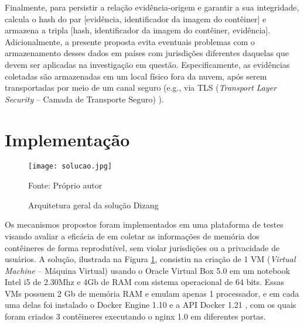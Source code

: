 Finalmente, para persistir a relação evidência-origem e garantir a sua integridade, \fancyname calcula o hash do par [evidência, identificador da imagem do contêiner] e armazena a tripla [hash, identificador da imagem do contêiner, evidência].
%
Adicionalmente, a presente proposta evita eventuais problemas com o armazenamento desses dados em países com jurisdições diferentes daquelas que devem ser aplicadas na investigação em questão.
%
Especificamente, as evidências coletadas são armazenadas em um local físico fora da nuvem, após serem transportadas por meio de um canal seguro (e.g., via TLS (\textit{Transport Layer Security} -- Camada de Transporte Seguro) \cite{DierksT2008}).
%

\section{Implementação}
\label{sec:proposta-impl}


\begin{figure}[htb!]
\footnotesize
\caption{Arquitetura geral da solução Dizang}
\texttt{[image: solucao.jpg]}
\centering
\label{fig:Solucao}
\begin{center}
Fonte: Próprio autor 
\end{center}
\end{figure}


Os mecanismos propostos foram implementados em uma plataforma de testes visando avaliar a eficácia de \fancyname em coletar as informações de memória dos contêineres de forma reprodutível, sem violar jurisdições ou a privacidade de usuários.
%
A solução, ilustrada na Figura \ref{fig:Solucao}, consistiu na criação de 1 VM  (\textit{Virtual Machine} -- Máquina Virtual) usando o Oracle Virtual Box 5.0 \cite{VirtualBox} em um notebook Intel i5 de 2.30Mhz e 4Gb de RAM com sistema operacional de 64 bits.
%
Essas VMs possuem 2 Gb de memória RAM e emulam apenas 1 processador, e em cada uma delas foi instalado o Docker Engine 1.10%
 e a API Docker 1.21%
, com os quais foram criados 3 contêineres executando o nginx 1.0%
 em diferentes portas. 


